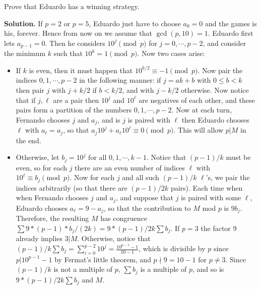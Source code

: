 \documentclass[11pt,a4paper]{article}
\begin{document}
\begin{enumerate}
	Prove that Eduardo has a winning strategy.
	
	\textbf{Solution.} If $p=2$ or $p=5$, Eduardo just have to choose $a_0=0$ and the games is his, forever. Hence from now on we assume that $\gcd(p, 10)=1$. Eduardo first lets $a_{p-1}=0$. Then he considers $10^j\pmod{p}$ for $j=0, \cdots , p-2$, and consider the minimum $k$ such that $10^k=1\pmod{p}$. Now two cases arise: 
	\begin{itemize}
		\item If $k$ is even, then it must happen that $10^{k/2}\equiv -1\pmod{p}$. Now pair the indices $0, 1, \cdots , p-2$ in the following manner: if $j=ak+b$ with $0\le b<k$ then pair $j$ with $j + k/2$ if $b<k/2$, and with $j - k/2$ otherwise. Now notice that if $j, \ell$ are a pair then $10^j$ and $10^{\ell}$ are negatives of each other, and these pairs form a partition of the numbers $0, 1, \cdots , p - 2$. Now at each turn, Fernando chooses $j$ and $a_j$, and is $j$ is paired with $\ell$ then Eduardo chooses $\ell$ with $a_\ell = a_j$, so that $a_j10^j+a_\ell10^{\ell}\equiv 0\pmod{p}$. This will allow $p|M$ in the end. 
		\item Otherwise, let $b_j=10^j$ for all $0, 1, \cdots , k-1$. Notice that $(p-1)/k$ must be even, so for each $j$ there are an even number of indices $\ell$ with $10^{\ell}\equiv b_j\pmod{p}$. Now for each $j$ and all such $(p-1)/k$ $\ell$'s, we pair the indices arbitrarily (so that there are $(p-1)/2k$ pairs). Each time when when Fernando chooses $j$ and $a_j$, and suppose that $j$ is paired with some $\ell$, Eduardo chooses $a_\ell=9-a_j$, so that the contribution to $M$ mod $p$ is $9b_j$. Therefore, the resulting $M$ has congruence $\sum 9*(p-1)*b_j/(2k)=9*(p-1)/2k\sum b_j$. If $p=3$ the factor 9 already implies $3|M$. Otherwise, notice that $(p-1)/k\sum b_j=\sum_{i=0}^{p-2}10^{j}=\frac{10^{p-1}-1}{10-1}$, which is divisible by $p$ since $p|10^{p-1}-1$ by Fermat's little theorem, and $p\nmid 9=10-1$ for $p\neq 3$. Since $(p-1)/k$ is not a multiple of $p$, $\sum b_j$ is a multiple of $p$, and so is $9*(p-1)/2k\sum b_j$ and $M$. 
	\end{itemize}
	\end{enumerate}
\end{document}
